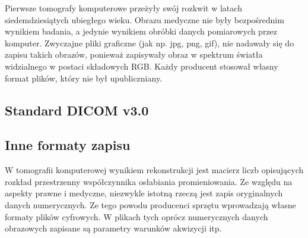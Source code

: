 
\par
Pierwsze tomografy komputerowe przeżyły swój rozkwit w latach siedemdziesiątych ubiegłego wieku.
Obrazu medyczne nie były bezpośrednim wynikiem badania, a jedynie wynikiem obróbki danych pomiarowych przez komputer.
Zwyczajne pliki graficzne (jak np. jpg, png, gif), nie nadawały się do zapisu takich obrazów, ponieważ zapisywały obraz w spektrum światła widzialnego w postaci składowych RGB.
Każdy producent stosował  własny format plików, który nie był upubliczniany.

\subsection{Standard DICOM v3.0}


\subsection{Inne formaty zapisu}

\par
W tomografii komputerowej wynikiem rekonstrukcji jest macierz liczb opisujących rozkład przestrzenny współczynnika osłabiania promieniowania.
Ze względu na aspekty prawne i medyczne, niezwykle istotną rzeczą jest zapis oryginalnych danych numerycznych. Ze tego powodu producenci sprzętu wprowadzają własne formaty plików cyfrowych.
W plikach tych oprócz numerycznych danych obrazowych zapisane są parametry warunków akwizycji itp.